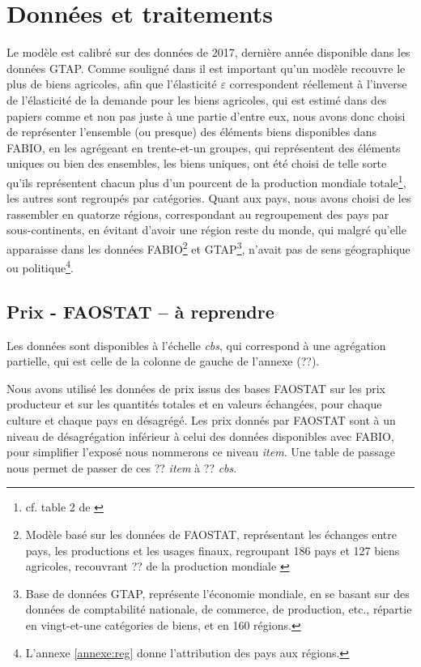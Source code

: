 \section{Données et traitements}

Le modèle est calibré sur des données de 2017, dernière année disponible dans les données GTAP. Comme souligné dans \cite{Gouel2021} il est important qu'un modèle recouvre le plus de biens agricoles, afin que l'élasticité $\varepsilon$ correspondent réellement à l'inverse de l'élasticité de la demande pour les biens agricoles, qui est estimé dans des papiers comme \cite{Comin2021} et non pas juste à une partie d'entre eux, nous avons donc choisi de représenter l'ensemble (ou presque) des éléments biens disponibles dans FABIO, en les agrégeant en trente-et-un groupes, qui représentent des éléments uniques ou bien des ensembles, les biens uniques, ont été choisi de telle sorte qu'ils représentent chacun plus d'un pourcent de la production mondiale totale\footnote{cf. table 2 de \cite{Gouel2021}}, les autres sont regroupés par catégories. Quant aux pays, nous avons choisi de les rassembler en quatorze régions, correspondant au regroupement des pays par sous-continents, en évitant d'avoir une région reste du monde, qui malgré qu'elle apparaisse dans les données FABIO\footnote{Modèle basé sur les données de FAOSTAT, représentant les échanges entre pays, les productions et les usages finaux, regroupant 186 pays et 127 biens agricoles, recouvrant ?? de la production mondiale \cite{Bruckner2019}} et GTAP\footnote{Base de données GTAP, représente l'économie mondiale, en se basant sur des données de comptabilité nationale, de commerce, de production, etc., répartie en vingt-et-une catégories de biens, et en 160 régions.}, n'avait pas de sens géographique ou politique\footnote{L'annexe \ref{annexe:reg} donne l'attribution des pays aux régions.}.


\subsection{Prix - FAOSTAT -- \textbf{à reprendre}}\label{subsec:prix}

Les données sont disponibles à l'échelle \textit{cbs}, qui correspond à une agrégation partielle, qui est celle de la colonne de gauche de l'annexe (??).

Nous avons utilisé les données de prix issus des bases FAOSTAT sur les prix producteur et sur les quantités totales et en valeurs échangées, pour chaque culture et chaque pays en désagrégé. Les prix donnés par FAOSTAT sont à un niveau de désagrégation inférieur à celui des données disponibles avec FABIO, pour simplifier l'exposé nous nommerons ce niveau \textit{item}. Une table de passage nous permet de passer de ces ?? \textit{item} à ?? \textit{cbs}.


